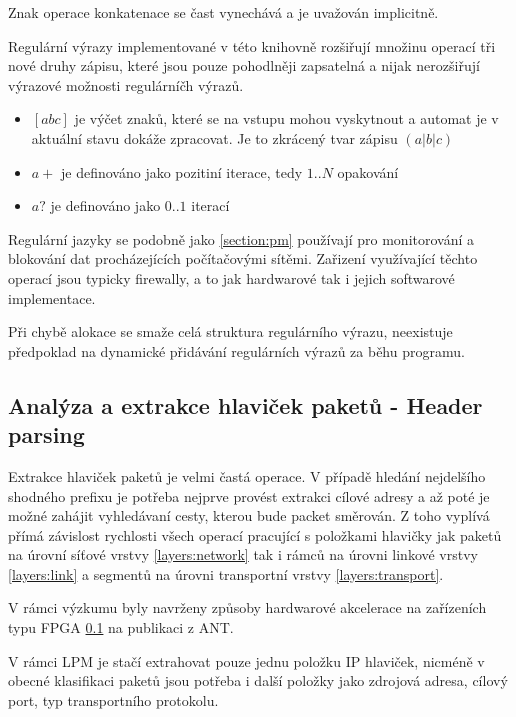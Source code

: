 Znak operace konkatenace %
se čast vynechává a je uvažován implicitně.

Regulární výrazy implementované v této knihovně rozšiřují množinu operací tři nové druhy zápisu,
které jsou pouze pohodlněji zapsatelná a nijak nerozšiřují výrazové možnosti regulárníčh výrazů.

\begin{itemize}
	\item{$[abc]$ je výčet znaků, které se na vstupu mohou vyskytnout a automat je v aktuální stavu dokáže zpracovat. Je to zkrácený tvar zápisu $(a|b|c)$}
	\item{$a+$ je definováno jako pozitiní iterace, tedy $1..N$ opakování}
	\item{$a?$ je definováno jako $0..1$ iterací}
\end{itemize}

Regulární jazyky se podobně jako \ref{section:pm} používají pro monitorování a blokování dat procházejících
počítačovými sítěmi. Zařizení využívající těchto operací jsou typicky firewally, a to jak hardwarové tak i jejich
softwarové implementace.

Při chybě alokace se smaže celá struktura regulárního výrazu, neexistuje předpoklad na
dynamické přidávání regulárních výrazů za běhu programu.


\subsection{Analýza a extrakce hlaviček paketů - Header parsing}

Extrakce hlaviček paketů je velmi častá operace.
V případě hledání nejdelšího shodného prefixu je potřeba nejprve provést extrakci
cílové adresy a až poté je možné zahájit vyhledávaní cesty, kterou bude packet směrován.
Z toho vyplívá přímá závislost rychlosti všech operací pracující s položkami hlavičky jak paketů
na úrovní síťové vrstvy \ref{layers:network} tak i rámců na úrovni linkové vrstvy \ref{layers:link}
a segmentů na úrovni transportní vrstvy \ref{layers:transport}.

V rámci výzkumu byly navrženy způsoby hardwarové akcelerace na zařízeních typu FPGA \ref{} na publikaci
z ANT.

V rámci LPM je stačí extrahovat pouze jednu položku IP hlaviček,
nicméně v obecné klasifikaci paketů jsou potřeba i další položky jako zdrojová adresa,
cílový port, typ transportního protokolu.



